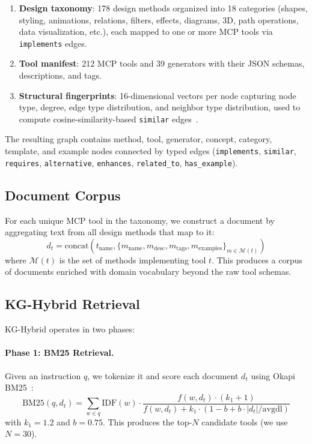 \documentclass[11pt,a4paper]{article}
\begin{document}
\begin{enumerate}
  \item \textbf{Design taxonomy}: 178 design methods organized into 18 categories (shapes, styling, animations, relations, filters, effects, diagrams, 3D, path operations, data visualization, etc.), each mapped to one or more MCP tools via \texttt{implements} edges.
  \item \textbf{Tool manifest}: 212 MCP tools and 39 generators with their JSON schemas, descriptions, and tags.
  \item \textbf{Structural fingerprints}: 16-dimensional vectors per node capturing node type, degree, edge type distribution, and neighbor type distribution, used to compute cosine-similarity-based \texttt{similar} edges~\citep{ribeiro2017struc2vec}.
\end{enumerate}

The resulting graph contains method, tool, generator, concept, category, template, and example nodes connected by typed edges (\texttt{implements}, \texttt{similar}, \texttt{requires}, \texttt{alternative}, \texttt{enhances}, \texttt{related\_to}, \texttt{has\_example}).

\subsection{Document Corpus}

For each unique MCP tool in the taxonomy, we construct a document by aggregating text from all design methods that map to it:
$$d_t = \text{concat}(t_{\text{name}}, \{m_{\text{name}}, m_{\text{desc}}, m_{\text{tags}}, m_{\text{examples}}\}_{m \in \mathcal{M}(t)})$$
where $\mathcal{M}(t)$ is the set of methods implementing tool $t$. This produces a corpus of documents enriched with domain vocabulary beyond the raw tool schemas.

\subsection{KG-Hybrid Retrieval}

KG-Hybrid operates in two phases:

\paragraph{Phase 1: BM25 Retrieval.}
Given an instruction $q$, we tokenize it and score each document $d_t$ using Okapi BM25~\citep{robertson2009bm25}:
$$\text{BM25}(q, d_t) = \sum_{w \in q} \text{IDF}(w) \cdot \frac{f(w, d_t) \cdot (k_1 + 1)}{f(w, d_t) + k_1 \cdot (1 - b + b \cdot |d_t| / \text{avgdl})}$$
with $k_1 = 1.2$ and $b = 0.75$. This produces the top-$N$ candidate tools (we use $N=30$).
\end{document}
